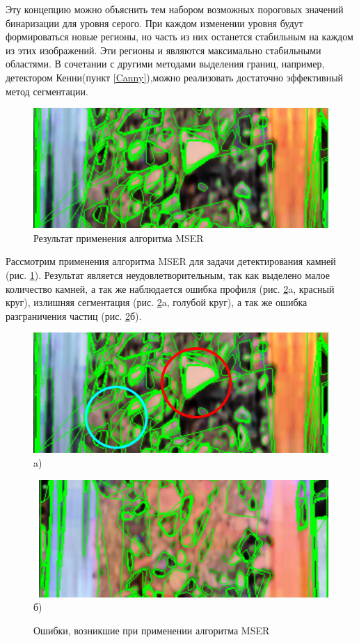 \documentclass[times]{itmo-student-thesis}
\begin{document}
Эту концепцию можно объяснить тем набором возможных пороговых значений бинаризации для уровня серого. При каждом изменении уровня будут формироваться новые регионы, но часть из них останется стабильным на каждом из этих изображений.  Эти регионы и являются максимально стабильными областями. В сочетании с другими методами выделения границ, например, детектором Кенни(пункт \ref{Canny}),можно реализовать достаточно эффективный метод сегментации.

\begin{figure}[h]
	\centering
	\includegraphics[width=0.6\linewidth]{images/mser1}
	\caption{Результат применения алгоритма MSER}
	\label{fig:mser}
\end{figure}


Рассмотрим применения алгоритма MSER для задачи детектирования камней (рис. \ref{fig:mser}). Результат является неудовлетворительным, так как выделено малое количество камней, а так же наблюдается ошибка профиля (рис. \ref{fig:mser1}a, красный круг), излишняя сегментация (рис. \ref{fig:mser1}a, голубой круг), а так же ошибка разграничения частиц (рис. \ref{fig:mser1}б).

\begin{figure}[h]
	\begin{minipage}[h]{0.49\linewidth}
		\centering
		\includegraphics[width=0.9\linewidth]{images/mser2} \\ a)
	\end{minipage}
	\hfill
	\begin{minipage}[h]{0.49\linewidth}
		\centering
		\includegraphics[width=0.9\linewidth]{images/mser3} \\ б)
	\end{minipage}
	\caption{Ошибки, возникшие при применении алгоритма MSER}
	\label{fig:mser1}
\end{figure}
\end{document}
